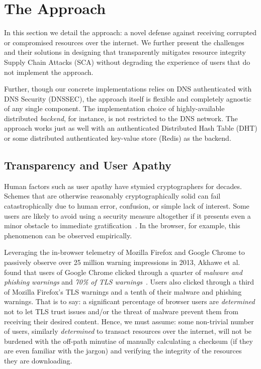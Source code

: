 \section{The \SYSTEM{} Approach} \label{sec:approach}

In this section we detail the \SYSTEM{} approach: a novel defense against
receiving corrupted or compromised resources over the internet. We further
present the challenges and their solutions in designing \SYSTEM{} that
transparently mitigates resource integrity Supply Chain Attacks (SCA) without
degrading the experience of users that do not implement the \SYSTEM{} approach.

Further, though our concrete implementations relies on DNS authenticated with
DNS Security (DNSSEC), the approach itself is flexible and completely agnostic
of any single component. The implementation choice of highly-available
distributed \emph{backend}, for instance, is not restricted to the DNS network.
The approach works just as well with an authenticated Distributed Hash Table
(DHT) or some distributed authenticated key-value store (\eg Redis) as the
backend.


\subsection{Transparency and User Apathy}

Human factors such as user apathy have stymied cryptographers for decades.
Schemes that are otherwise reasonably cryptographically solid can fail
catastrophically due to human error, confusion, or simple lack of interest. Some
users are likely to avoid using a security measure altogether if it presents
even a minor obstacle to immediate gratification~\cite{Clickthrough, PGPBad}. In
the browser, for example, this phenomenon can be observed empirically.

Leveraging the in-browser telemetry of Mozilla Firefox and Google Chrome to
passively observe over 25 million warning impressions in 2013, Akhawe et al.
found that users of Google Chrome clicked through a quarter of \emph{malware and
phishing warnings} and \emph{70\% of TLS warnings}~\cite{Clickthrough}. Users
also clicked through a third of Mozilla Firefox's TLS warnings and a tenth of
their malware and phishing warnings. That is to say: a significant percentage of
browser users are \emph{determined} not to let TLS trust issues and/or the
threat of malware prevent them from receiving their desired content. Hence, we
must assume: some non-trivial number of users, similarly \emph{determined} to
transact resources over the internet, will not be burdened with the off-path
minutiae of manually calculating a checksum (if they are even familiar with the
jargon) and verifying the integrity of the resources they are downloading.

